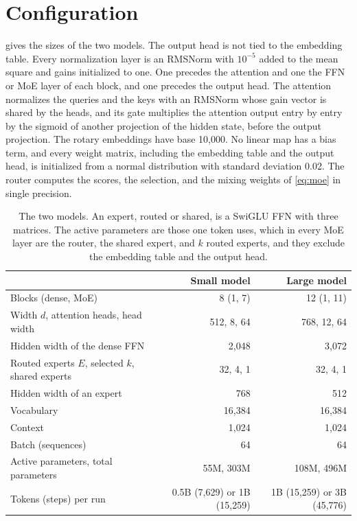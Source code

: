 \documentclass[11pt, a4paper]{article}
\begin{document}
\section{Configuration}
\label{app:configuration}

 gives the sizes of the two models. The output head is not tied to the embedding table. Every normalization layer is an RMSNorm with $10^{-5}$ added to the mean square and gains initialized to one. One precedes the attention and one the FFN or MoE layer of each block, and one precedes the output head. The attention normalizes the queries and the keys with an RMSNorm whose gain vector is shared by the heads, and its gate multiplies the attention output entry by entry by the sigmoid of another projection of the hidden state, before the output projection. The rotary embeddings have base 10,000. No linear map has a bias term, and every weight matrix, including the embedding table and the output head, is initialized from a normal distribution with standard deviation 0.02. The router computes the scores, the selection, and the mixing weights of \cref{eq:moe} in single precision.

\begin{table}[ht]
  \centering
  \caption{The two models. An expert, routed or shared, is a SwiGLU FFN with three matrices. The active parameters are those one token uses, which in every MoE layer are the router, the shared expert, and $k$ routed experts, and they exclude the embedding table and the output head.}
  \label{tab:architecture}
  \small
  \begin{tabular*}{\textwidth}{@{\extracolsep{\fill}}lrr@{}}
    \toprule
    & Small model & Large model \\
    \midrule
    Blocks (dense, MoE) & 8 (1, 7) & 12 (1, 11) \\
    Width $d$, attention heads, head width & 512, 8, 64 & 768, 12, 64 \\
    Hidden width of the dense FFN & 2,048 & 3,072 \\
    Routed experts $E$, selected $k$, shared experts & 32, 4, 1 & 32, 4, 1 \\
    Hidden width of an expert & 768 & 512 \\
    Vocabulary & 16,384 & 16,384 \\
    Context & 1,024 & 1,024 \\
    Batch (sequences) & 64 & 64 \\
    Active parameters, total parameters & 55M, 303M & 108M, 496M \\
    Tokens (steps) per run & 0.5B (7,629) or 1B (15,259) & 1B (15,259) or 3B (45,776) \\
    \bottomrule
  \end{tabular*}
\end{table}
\end{document}
